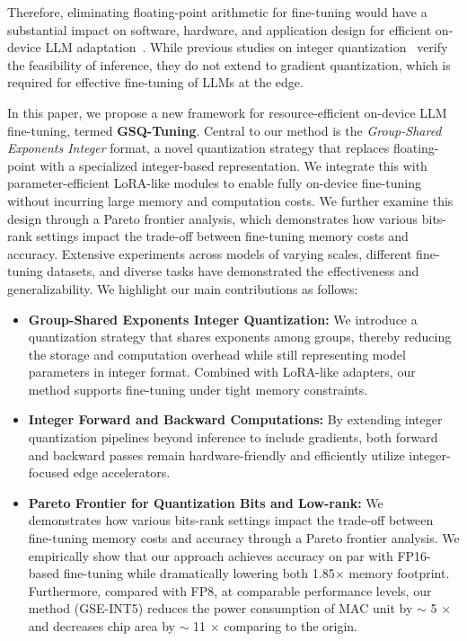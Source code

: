 Therefore, eliminating floating-point arithmetic for fine-tuning would have a substantial impact on software, hardware, and application design for efficient on-device LLM adaptation~\citep{ARM2020,kim2021bert}. 
While previous studies on integer quantization~\citep{jacob2018quantization,kim2021bert,xiao2022smoothquant, yuan2023rptq} verify the feasibility of inference, they do not extend to gradient quantization, which is required for effective fine-tuning of LLMs at the edge.

In this paper, we propose a new framework for resource-efficient on-device LLM fine-tuning, termed \textbf{GSQ-Tuning}. Central to our method is the \emph{Group-Shared Exponents Integer} format, a novel quantization strategy that replaces floating-point with a specialized integer-based representation. 
We integrate this with parameter-efficient LoRA-like modules to enable fully on-device fine-tuning without incurring large memory and computation costs. 
We further examine this design through a Pareto frontier analysis, which demonstrates how various bits-rank settings impact the trade-off between fine-tuning memory costs and accuracy. Extensive experiments across models of varying scales, different fine-tuning datasets, and diverse tasks have demonstrated the effectiveness and generalizability.
We highlight our main contributions as follows:
\begin{itemize}
    \item  \textbf{Group-Shared Exponents Integer Quantization:} We introduce a quantization strategy that shares exponents among groups, thereby reducing the storage and computation overhead while still representing model parameters in integer format. Combined with LoRA-like adapters, our method supports fine-tuning under tight memory constraints. 
    \item \textbf{Integer Forward and Backward Computations:} By extending integer quantization pipelines beyond inference to include gradients, both forward and backward passes remain hardware-friendly and efficiently utilize integer-focused edge accelerators. 
    \item \textbf{Pareto Frontier for Quantization Bits and Low-rank:} We demonstrates how various bits-rank settings impact the trade-off between fine-tuning memory costs and accuracy through a Pareto frontier analysis. We empirically show that our approach achieves accuracy on par with FP16-based fine-tuning while dramatically lowering both 1.85$\times$ memory footprint. Furthermore, compared with FP8, at comparable performance levels, our method (GSE-INT5) reduces the power consumption of MAC unit by $\sim$ 5 $\times$ and decreases chip area by $\sim$ 11 $\times$ comparing to the origin.
\end{itemize}